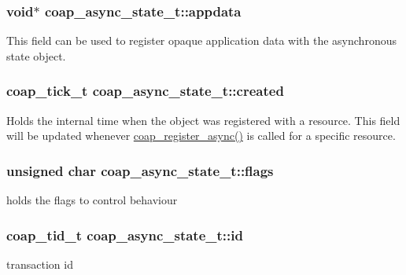 \subsubsection[{appdata}]{\setlength{\rightskip}{0pt plus 5cm}void$\ast$ coap\+\_\+async\+\_\+state\+\_\+t\+::appdata}\label{structcoap__async__state__t_a8bfdf12963290e8284e1510b093b17c1}
This field can be used to register opaque application data with the asynchronous state object. \hypertarget{structcoap__async__state__t_a2ce04f273a47df97dfb8af270c858007}{}
\subsubsection[{created}]{\setlength{\rightskip}{0pt plus 5cm}coap\+\_\+tick\+\_\+t coap\+\_\+async\+\_\+state\+\_\+t\+::created}\label{structcoap__async__state__t_a2ce04f273a47df97dfb8af270c858007}
Holds the internal time when the object was registered with a resource. This field will be updated whenever \hyperlink{group__coap__async_ga1c81eb1d464e9b5195acb7ae630e15c9}{coap\+\_\+register\+\_\+async()} is called for a specific resource. \hypertarget{structcoap__async__state__t_a34237f37d4c44962f4c4f0dbf39560c1}{}
\subsubsection[{flags}]{\setlength{\rightskip}{0pt plus 5cm}unsigned char coap\+\_\+async\+\_\+state\+\_\+t\+::flags}\label{structcoap__async__state__t_a34237f37d4c44962f4c4f0dbf39560c1}
holds the flags to control behaviour \hypertarget{structcoap__async__state__t_af6bd1cb2573d3b38e5c1c1175d52f471}{}
\subsubsection[{id}]{\setlength{\rightskip}{0pt plus 5cm}coap\+\_\+tid\+\_\+t coap\+\_\+async\+\_\+state\+\_\+t\+::id}\label{structcoap__async__state__t_af6bd1cb2573d3b38e5c1c1175d52f471}
transaction id \hypertarget{structcoap__async__state__t_a94feaa6adcb5c4c244dc33608a37ba3f}{}
